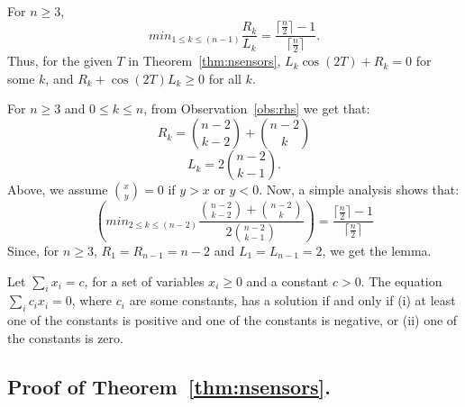 % 


\begin{lem-prf}
For $n\geq3$,
$$min_{1 \leq k \leq (n-1)} \frac{R_k}{L_k} =  \frac{\lceil \frac{n}{2} \rceil - 1}{\lceil \frac{n}{2} \rceil}.$$ 
Thus, for the given $T$ in Theorem~\ref{thm:nsensors}, $L_k\cos(2T) + R_k = 0$ for some $k$, and 
$R_k + \cos(2T)L_k \geq 0$ for all $k$.
\label{lemma:t}
\end{lem-prf}
\begin{prf}
For  $n \geq 3$ and $0 \leq k \leq n$, from Observation~\ref{obs:rhs} we get that: 
$$R_k = {n-2 \choose k-2} + {n-2 \choose k}$$
$$L_k = 2 {n-2 \choose k-1}.$$
Above, we assume ${x \choose y} = 0$ if $y > x$ or $y < 0$.
Now, a simple analysis shows that:
$$\left(min_{2 \leq k \leq (n-2)} \frac{{n-2 \choose k-2} + {n-2 \choose k}}{2 {n-2 \choose k-1}}\right) =  \frac{\lceil \frac{n}{2} \rceil - 1}{\lceil \frac{n}{2} \rceil}$$ 
Since, for $n \geq 3$, $R_1 = R_{n-1} = n-2$ and $L_1=L_{n-1}=2$, we get the lemma. 
\end{prf}

\begin{observation}
Let $\sum_i x_i =c$, for a set of variables $x_i \geq 0$ and a constant $c > 0$.
The equation $\sum_i c_ix_i = 0$, where $c_i$ are some constants, has a solution if and only if (i) at least one of the constants is positive and one of the constants is negative, or (ii) one of the constants is zero.
\label{obs:pos-neg}
\end{observation}


\subsection{\bf Proof of Theorem~\ref{thm:nsensors}.}

